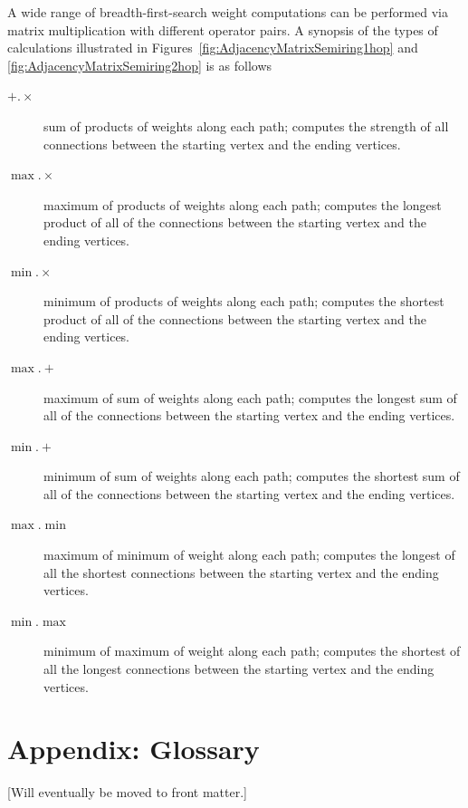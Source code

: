   A wide range of breadth-first-search weight computations can be performed via matrix multiplication with different operator pairs.  A synopsis of the types of calculations illustrated in Figures~\ref{fig:AdjacencyMatrixSemiring1hop} and \ref{fig:AdjacencyMatrixSemiring2hop} is as follows
\begin{description}
\item[${+}.{\times}$] sum of products of weights along each path; computes the strength of all connections between the starting vertex and the ending vertices.
\item[${\max}.{\times}$] maximum of products of weights along each path; computes the longest product of all of the connections between the starting vertex and the ending vertices.
\item[${\min}.{\times}$] minimum of products of weights along each path; computes the shortest product of all of the connections between the starting vertex and the ending vertices.
\item[${\max}.{+}$] maximum of sum of weights along each path; computes the longest sum of all of the connections between the starting vertex and the ending vertices.
\item[${\min}.{+}$] minimum of sum of weights along each path; computes the shortest sum of all of the connections between the starting vertex and the ending vertices.
\item[${\max}.{\min}$] maximum of minimum of weight along each path; computes the longest of all the shortest connections between the starting vertex and the ending vertices.
\item[${\min}.{\max}$] minimum of maximum of weight along each path; computes the shortest of all the longest connections between the starting vertex and the ending vertices.
\end{description}

\section{Appendix: Glossary}
  [Will eventually be moved to front matter.]

